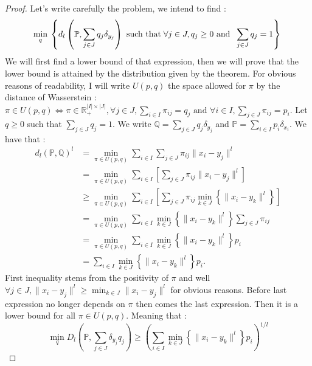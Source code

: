 \documentclass{amsart}
\newcommand{\RR}{\mathbb{R}}
\begin{document}
\begin{proof}
    Let's write carefully the problem, we intend to find :
    $$
        \min_{q}\:\left\{d_l\left(\mathbb{P},\sum_{j\in J}q_j\delta_{y_j}\right)\text{ such that} \; \forall j\in J, q_j\geq 0 \text{ and } \;\sum_{j\in J}q_j=1 \right\}\\
    $$
    We will first find a lower bound of that expression, then we will prove that the lower bound is attained by the distribution given by the theorem.
    \newline
    For obvious reasons of readability, I will write $U\left(p,q\right)$ the space allowed for $\pi$ by the distance of Wasserstein :\newline
    $\pi\in U\left(p,q\right) \iff \pi\in\RR^{\lvert I\rvert \times\lvert J\vert}_+, \forall j\in J, \sum_{i\in I}\pi_{ij}=q_j \text{ and } \forall i\in I, \sum_{j\in J}\pi_{ij}=p_i$.
    \newline
    Let $q\geq 0$ such that $\sum_{j\in J}q_j=1$. We write $\mathbb{Q}=\sum_{j\in J}q_j\delta_{y_j}$ and $\mathbb{P}=\sum_{i\in I}p_i\delta_{x_i}$.  We have that :
    \begin{align*}
        d_l\left(\mathbb{P},\mathbb{Q}\right)^l&=            \min_{\pi\in U\left(p,q\right)}\sum_{i\in I}\sum_{j\in J}\pi_{ij}\lVert x_i-y_j\rVert^l \\ &= \min_{\pi\in U\left(p,q\right)}\sum_{i\in I}\left[\sum_{j\in J}\pi_{ij}\lVert x_i-y_j\rVert^l\right] \\
        &\geq \min_{\pi\in U\left(p,q\right)}\sum_{i\in I}\left[\sum_{j\in J}\pi_{ij}\min_{k\in J}\left\{\lVert x_i-y_k\lVert^l\right\}\right] \\ &= \min_{\pi\in U\left(p,q\right)}\sum_{i\in I}\min_{k\in J}\left\{\lVert x_i-y_k\lVert^l\right\}\sum_{j\in J}\pi_{ij} \\
        &=\min_{\pi\in U\left(p,q\right)}\sum_{i\in I}\min_{k\in J}\left\{\lVert x_i-y_k\lVert^l\right\}p_i \\& =\sum_{i\in I}\min_{k\in J}\left\{\lVert x_i-y_k\lVert^l\right\}p_i.
    \end{align*}
First inequality stems from the positivity of $\pi$ and well $\forall j\in J, \lVert x_i-y_j\rVert^l \geq \min_{k\in J}\lVert x_i-y_j\rVert^l$ for obvious reasons. Before last expression no longer depends on $\pi$ then comes the last expression. Then it is a lower bound for all $\pi\in U\left(p,q\right)$. Meaning that :
$$
\min_{q} D_l\left(\mathbb{P},\sum_{j\in J}\delta_{y_j}q_j\right) \geq \left(\sum_{i\in I}\min_{k\in J}\left\{\lVert x_i-y_k\lVert^l\right\}p_i\right)^{1/l}
$$
\newline


\end{proof}
\end{document}
